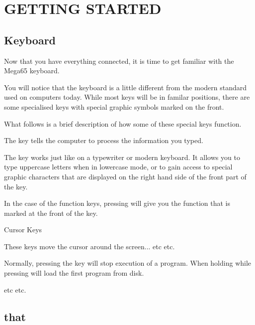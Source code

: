 \chapter{GETTING STARTED}
\section{Keyboard}

Now that you have everything connected, it is time to get familiar with the Mega65 keyboard.

You will notice that the keyboard is a little different from the modern standard used on computers today. While most keys will be in familar positions, there are some specialised keys with special graphic symbols marked on the front.

What follows is a brief description of how some of these special keys function.

 \vspace*{1cm}


The  key tells the computer to process the information you typed.

 \vspace*{1cm}


The  key works just like on a typewriter or modern keyboard. It allows you to type uppercase letters when in lowercase mode, or to gain access to special graphic characters that are displayed on the right hand side of the front part of the key.

In the case of the function keys, pressing  will give you the function that is marked at the front of the key.

 \vspace*{1cm}

\megakey{\leftarrow} \megakey{\uparrow} \megakey{\rightarrow} \megakey{\downarrow} Cursor Keys

These keys move the cursor around the screen... etc etc.

 \vspace*{1cm}


Normally, pressing the  key will stop execution of a program. When holding  while pressing  will load the first program from disk.

 \vspace*{1cm}


etc etc.


\section{that}


